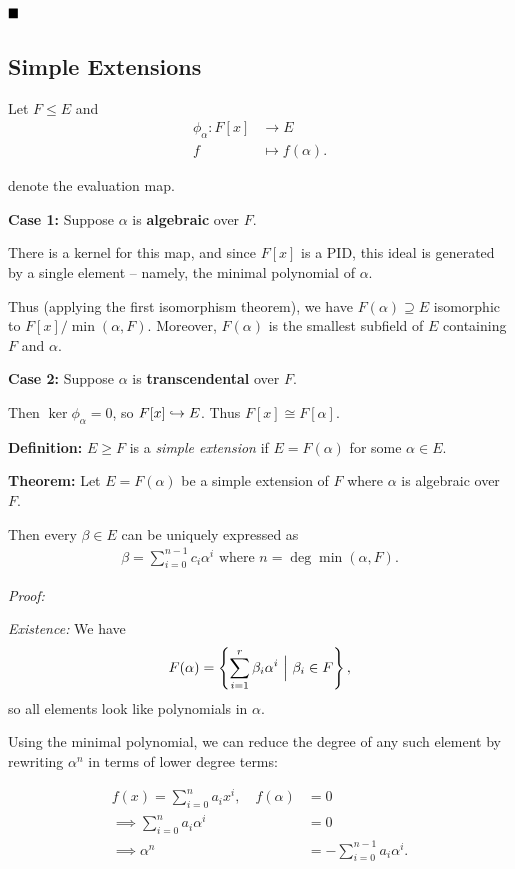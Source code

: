 \(\qed\)

\hypertarget{simple-extensions}{%
\subsection{Simple Extensions}\label{simple-extensions}}

Let \(F \leq E\) and \begin{align*}
\phi_\alpha: F[x] &\to E \\
f &\mapsto f(\alpha)
.\end{align*}

denote the evaluation map.

\textbf{Case 1:} Suppose \(\alpha\) is \textbf{algebraic} over \(F\).

There is a kernel for this map, and since \(F[x]\) is a PID, this ideal
is generated by a single element -- namely, the minimal polynomial of
\(\alpha\).

Thus (applying the first isomorphism theorem), we have
\(F(\alpha) \supseteq E\) isomorphic to \(F[x] / \min(\alpha, F)\).
Moreover, \(F(\alpha)\) is the smallest subfield of \(E\) containing
\(F\) and \(\alpha\).

\textbf{Case 2:} Suppose \(\alpha\) is \textbf{transcendental} over
\(F\).

Then \(\ker \phi_\alpha = 0\), so \(F[x] \hookrightarrow E\). Thus
\(F[x] \cong F[\alpha]\).

\textbf{Definition:} \(E \geq F\) is a \emph{simple extension} if
\(E = F(\alpha)\) for some \(\alpha \in E\).

\textbf{Theorem:} Let \(E = F(\alpha)\) be a simple extension of \(F\)
where \(\alpha\) is algebraic over \(F\).

Then every \(\beta \in E\) can be uniquely expressed as
\begin{align*}
\beta = \sum_{i=0}^{n-1} c_i \alpha^i \text{ where } n = \deg \min(\alpha, F)
.\end{align*}

\emph{Proof:}

\emph{Existence:} We have
\begin{align*}
F(\alpha) = \left\{{\sum_{i=1}^r \beta_i \alpha^i {~\mathrel{\Big|}~} \beta_i \in F}\right\}
,\end{align*} so all elements look like polynomials in \(\alpha\).

Using the minimal polynomial, we can reduce the degree of any such
element by rewriting \(\alpha^n\) in terms of lower degree terms:

\begin{align*}
f(x) = \sum_{i=0}^n a_i x^i, \quad f(\alpha) &= 0 \\
\implies \sum_{i=0}^n a_i \alpha^i &= 0 \\
\implies \alpha^n &= -\sum_{i=0}^{n-1} a_i \alpha^i
.\end{align*}

